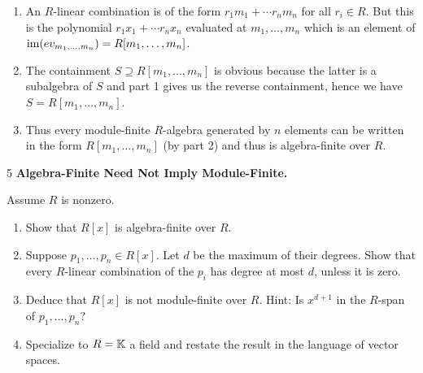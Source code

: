 \documentclass[Notebook.tex]{subfiles}
\begin{document}
\begin{solution}
    \bbni
    \begin{enumerate}
        \item An $R$-linear combination is of the form $r_1m_1 + \cdots r_nm_n$ for all $r_i \in R$. But this is the polynomial $r_1x_1 + \cdots r_nx_n$  evaluated at $m_1, \ldots, m_n$ which is an element of $\operatorname{im}(ev_{m_1, \ldots, m_n}) = R[m_1, \ldots, m_n]$.
        
        \item The containment $S \supseteq R[m_1, \ldots, m_n]$ is obvious because the latter is a subalgebra of $S$ and part 1 gives us the reverse containment, hence we have $S = R[m_1, \ldots, m_n]$. 
        
        \item Thus every module-finite $R$-algebra generated by $n$ elements can be written in the form $R[m_1, \ldots, m_n]$ (by part 2) and thus is algebra-finite over $R$. 
    \end{enumerate}
\end{solution}

\newpage

\begin{problem}{5} \textbf{Algebra-Finite Need Not Imply Module-Finite.} 
    
    Assume $R$ is nonzero.
    \begin{enumerate}
        \item Show that $R[x]$ is algebra-finite over $R$.
        \item Suppose $p_1,\ldots,p_n\in R[x]$. Let $d$ be the maximum of their degrees. Show that every $R$-linear combination of the $p_i$ has degree at most $d$, unless it is zero.
        \item Deduce that $R[x]$ is not module-finite over $R$. Hint: Is $x^{d+1}$ in the $R$-span of $p_1,\ldots,p_n$?
        \item Specialize to $R=\mathbb K$ a field and restate the result in the language of vector spaces.
    \end{enumerate}
\end{problem}
\end{document}
